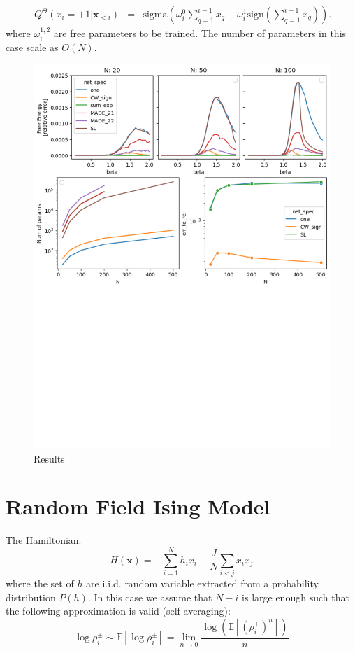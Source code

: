 \documentclass{article}
\begin{document}
\begin{eqnarray}\
\label{eq:curie_weiss_cond}
Q^{\Theta}\left(x_{i}=+1|\mathbf{x}_{<i}\right) & = & \text{sigma}\left(\omega_{i}^0\sum_{q=1}^{i-1}x_{q} + \omega_i^1 \text{sign}(\sum_{q=1}^{i-1}x_{q})\right).
\end{eqnarray}
where $\omega_i^{1,2}$ are free parameters to be trained. The number of parameters in this case scale as $O(N)$.

\begin{figure}[h]
    \centering
    \includegraphics[width=1\textwidth]{img/CW_res.pdf}
    \caption{Results}
    \label{fig:mesh1}
\end{figure}


\section{Random Field Ising Model}
The Hamiltonian:
\begin{equation}
H\left(\mathbf{x}\right)=-\sum_{i=1}^{N}h_ix_{i}-\frac{J}{N}\sum_{i<j}x_{i}x_{j}
\end{equation}
where the set of $\underline{h}$ are i.i.d. random variable extracted from a probability distribution $P(h)$. In this case 
we assume that $N-i$ is large enough such that the following approximation is valid (self-averaging): 
\[
\log\rho_i^{\pm} \sim \mathbb{E}\left[  \log\rho_i^{\pm} \right] = \lim_{n\rightarrow 0} \frac{  \log(\mathbb{E}\left[(\rho_i^{\pm})^n \right])}{n}
\]
\end{document}
